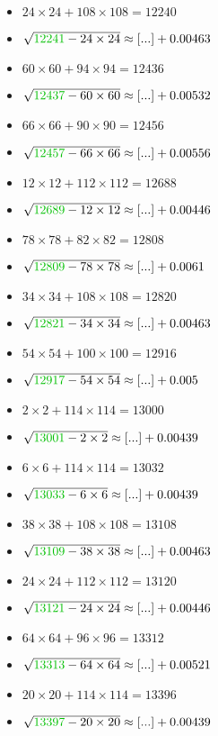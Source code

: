 \documentclass[12pt]{article}
\begin{document}
\begin{multicols}{2}
\begin{itemize}
\item $24\times24 + 108\times108 = 12240$
\item $\sqrt{ {\color{green!75!black}{12241}} - 24\times 24 } \approx [...] + 0.00463$
\item $60\times60 + 94\times94 = 12436$
\item $\sqrt{ {\color{green!75!black}{12437}} - 60\times 60 } \approx [...] + 0.00532$
\item $66\times66 + 90\times90 = 12456$
\item $\sqrt{ {\color{green!75!black}{12457}} - 66\times 66 } \approx [...] + 0.00556$
\item $12\times12 + 112\times112 = 12688$
\item $\sqrt{ {\color{green!75!black}{12689}} - 12\times 12 } \approx [...] + 0.00446$
\item $78\times78 + 82\times82 = 12808$
\item $\sqrt{ {\color{green!75!black}{12809}} - 78\times 78 } \approx [...] + 0.0061$
\item $34\times34 + 108\times108 = 12820$
\item $\sqrt{ {\color{green!75!black}{12821}} - 34\times 34 } \approx [...] + 0.00463$
\item $54\times54 + 100\times100 = 12916$
\item $\sqrt{ {\color{green!75!black}{12917}} - 54\times 54 } \approx [...] + 0.005$
\item $2\times2 + 114\times114 = 13000$
\item $\sqrt{ {\color{green!75!black}{13001}} - 2\times 2 } \approx [...] + 0.00439$
\item $6\times6 + 114\times114 = 13032$
\item $\sqrt{ {\color{green!75!black}{13033}} - 6\times 6 } \approx [...] + 0.00439$
\item $38\times38 + 108\times108 = 13108$
\item $\sqrt{ {\color{green!75!black}{13109}} - 38\times 38 } \approx [...] + 0.00463$
\item $24\times24 + 112\times112 = 13120$
\item $\sqrt{ {\color{green!75!black}{13121}} - 24\times 24 } \approx [...] + 0.00446$
\item $64\times64 + 96\times96 = 13312$
\item $\sqrt{ {\color{green!75!black}{13313}} - 64\times 64 } \approx [...] + 0.00521$
\item $20\times20 + 114\times114 = 13396$
\item $\sqrt{ {\color{green!75!black}{13397}} - 20\times 20 } \approx [...] + 0.00439$

\end{itemize}
\end{multicols}
\end{document}
